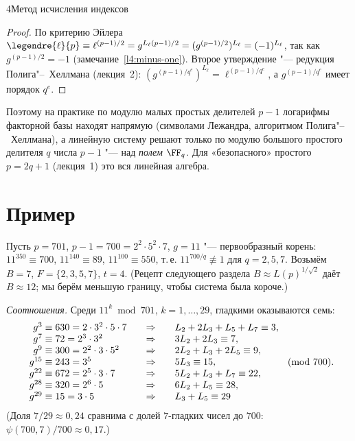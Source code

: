 \begin{lecture}{4}{Метод исчисления индексов}
\begin{proof}
По критерию Эйлера $\legendre{\ell}{p} \equiv \ell^{(p-1)/2} = g^{L_\ell (p-1)/2} =
(g^{(p-1)/2})^{L_\ell} = (-1)^{L_\ell}$, так как $g^{(p-1)/2} = -1$ (замечание~\ref{l4:minus-one}).
Второе утверждение "--- редукция Полига"--~Хеллмана (лекция~2): $(g^{(p-1)/q^e})^{L_\ell} =
\ell^{(p-1)/q^e}$, а $g^{(p-1)/q^e}$ имеет порядок $q^e$.
\end{proof}

Поэтому на практике по модулю малых простых делителей $p - 1$ логарифмы факторной базы находят
напрямую (символами Лежандра, алгоритмом Полига"--~Хеллмана), а линейную систему решают только
по модулю большого простого делителя $q$ числа $p - 1$ "--- над \emph{полем} $\FF_q$. Для
«безопасного» простого $p = 2q + 1$ (лекция~1) это вся линейная алгебра.



\section{Пример}

Пусть $p = 701$, $p - 1 = 700 = 2^2 \cdot 5^2 \cdot 7$, $g = 11$ "--- первообразный корень:
$11^{350} \equiv 700$, $11^{140} \equiv 89$, $11^{100} \equiv 550$, т.\,е. $11^{700/q} \not\equiv 1$
для $q = 2, 5, 7$. Возьмём $B = 7$, $F = \{2, 3, 5, 7\}$, $t = 4$.
(Рецепт следующего раздела $B \approx L(p)^{1/\sqrt2}$ даёт $B \approx 12$; мы берём меньшую
границу, чтобы система была короче.)

\emph{Соотношения.} Среди $11^k \bmod 701$, $k = 1, \dots, 29$, гладкими оказываются семь:
\[
\begin{array}{r@{\;\equiv\;}l@{\qquad\Rightarrow\qquad}l}
  g^{3} & 630 = 2 \cdot 3^2 \cdot 5 \cdot 7 & L_2 + 2L_3 + L_5 + L_7 \equiv 3,\\
  g^{7} & 72 = 2^3 \cdot 3^2 & 3L_2 + 2L_3 \equiv 7,\\
  g^{9} & 300 = 2^2 \cdot 3 \cdot 5^2 & 2L_2 + L_3 + 2L_5 \equiv 9,\\
  g^{15} & 243 = 3^5 & 5L_3 \equiv 15,\\
  g^{22} & 672 = 2^5 \cdot 3 \cdot 7 & 5L_2 + L_3 + L_7 \equiv 22,\\
  g^{28} & 320 = 2^6 \cdot 5 & 6L_2 + L_5 \equiv 28,\\
  g^{29} & 15 = 3 \cdot 5 & L_3 + L_5 \equiv 29
\end{array}
\pmod{700}.
\]
(Доля $7/29 \approx 0{,}24$ сравнима с долей $7$-гладких чисел до $700$: $\psi(700, 7)/700 \approx
0{,}17$.)


\end{lecture}
